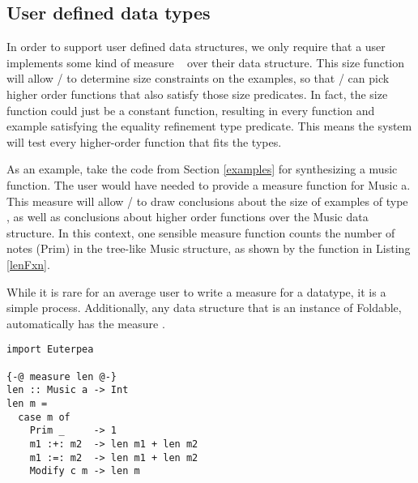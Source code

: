 \subsection{User defined data types}
In order to support user defined data structures, we only require that a user implements some kind of measure ~\cite{DBLP:conf/haskell/VazouSJ14} over their data structure.
This size function will allow \lhask/ to determine size constraints on the examples, so that \ourTool/ can pick higher order functions that also satisfy those size predicates.
In fact, the size function could just be a constant function, resulting in every function and example satisfying the equality refinement type predicate.
This means the system will test every higher-order function that fits the types.

As an example, take the code from Section \ref{examples} for synthesizing a music function.
The user would have needed to provide a measure function for Music a.
This measure will allow \lhask/ to draw conclusions about the size of examples of type , as well as conclusions about higher order functions over the Music data structure.
In this context, one sensible measure function counts the number of notes (Prim) in the tree-like Music structure, as shown by the  function in Listing \ref{lenFxn}.

While it is rare for an average user to write a measure for a datatype, it is a simple process.
Additionally, any data structure that is an instance of Foldable, automatically has the measure .

\begin{lstlisting}[caption=a user defined measure over a datatype,label=lenFxn]
import Euterpea

{-@ measure len @-}
len :: Music a -> Int
len m =
  case m of
    Prim _     -> 1
    m1 :+: m2  -> len m1 + len m2
    m1 :=: m2  -> len m1 + len m2
    Modify c m -> len m
\end{lstlisting}



